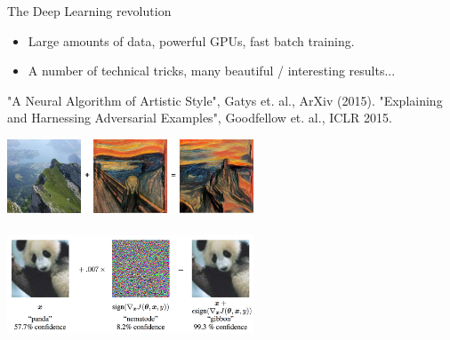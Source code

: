 \documentclass{beamer}
\begin{document}
\begin{frame}{The Deep Learning revolution}
    \begin{itemize}
      \item Large amounts of data, powerful GPUs, fast batch training.
      \item A number of technical tricks, many beautiful / interesting results...
    \end{itemize}

    "A Neural Algorithm of Artistic Style", Gatys et. al., ArXiv (2015).
    "Explaining and Harnessing Adversarial Examples", Goodfellow et. al., ICLR 2015.

    \begin{center}
      \includegraphics[width=0.55\textwidth]{./Figures/style_transfer} \\~\\
      \includegraphics[width=0.55\textwidth]{./Figures/adversarial}
    \end{center}
\end{frame}
\end{document}
